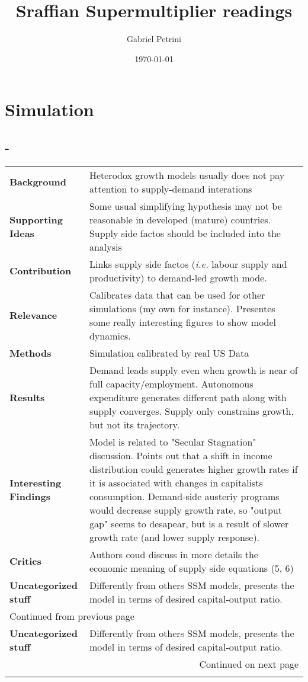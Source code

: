 \documentclass[11pt]{article}
\author{Gabriel Petrini}
\date{\today}
\title{Sraffian Supermultiplier readings}
\begin{document}
\maketitle
\tableofcontents



\section{Simulation}
\label{sec:org123d405}
\subsection{\cite{fazzaridemandled2020} -     }
\label{sec:org69d2da3}

\begin{longtable}{l|p{}}
\hline
\hline
\textbf{Background} & Heterodox growth models usually does not pay attention to supply-demand interations\\
\textbf{Supporting Ideas} & Some usual simplifying hypothesis may not be reasonable in developed (mature) countries. Supply side factos should be included into the analysis\\
\textbf{Contribution} & Links supply side factos (\emph{i.e.} labour supply and productivity) to demand-led growth mode.\\
\textbf{Relevance} & Calibrates data that can be used for other simulations (my own for instance). Presentes some really interesting figures to show model dynamics.\\
\textbf{Methods} & Simulation calibrated by real US Data\\
\textbf{Results} & Demand leads supply even when growth is near of full capacity/employment. Autonomous expenditure generates different path along with supply converges. Supply only constrains growth, but not its trajectory.\\
\textbf{Interesting Findings} & Model is related to "Secular Stagnation" discussion. Points out that a shift in income distribution could generates higher growth rates if it is associated with changes in capitalists consumption. Demand-side austeriy programs would decrease supply growth rate, so "output gap" seems to desapear, but is a result of slower growth rate (and lower supply response).\\
\textbf{Critics} & Authors coud discuss in more details the economic meaning of supply side equations (5, 6)\\
\textbf{Uncategorized stuff} & Differently from others SSM models, \textcite{fazzaridemandled2020} presents the model in terms of desired capital-output ratio.\\
\hline
\endfirsthead
\multicolumn{2}{l}{Continued from previous page} \\

\textbf{Uncategorized stuff} & Differently from others SSM models, \textcite{fazzaridemandled2020} presents the model in terms of desired capital-output ratio. \\

\hline
\endhead
\hline\multicolumn{2}{r}{Continued on next page} \\
\endfoot
\endlastfoot
\hline
\hline
\end{longtable}
\end{document}
